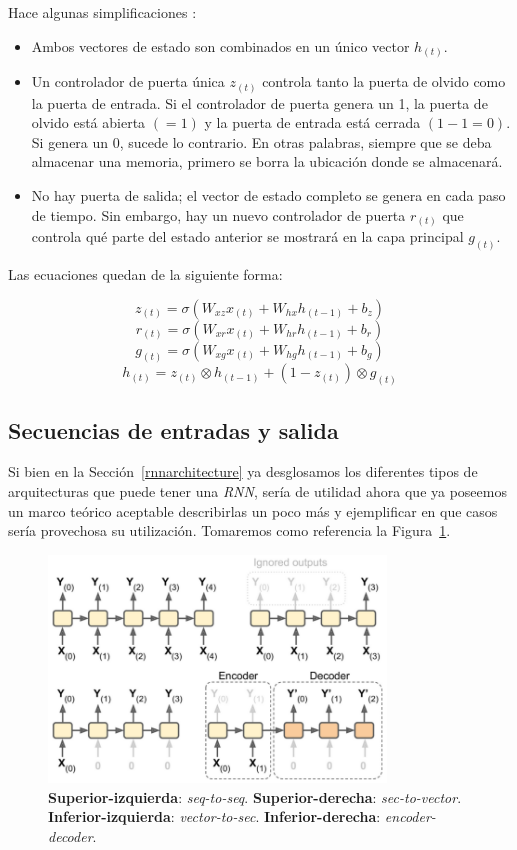 \documentclass[a4paper,12pt]{article}
\begin{document}
Hace algunas simplificaciones \citep{geron}:

\begin{itemize}[noitemsep, topsep=2pt]
	\item Ambos vectores de estado son combinados en un único vector $h_{(t)}$.
	\item Un controlador de puerta única $z_{(t)}$ controla tanto la puerta de olvido como la puerta de entrada. Si el controlador de puerta genera un 1, la puerta de olvido está abierta $(=1)$ y la puerta de entrada está cerrada $(1-1=0)$. Si genera un 0, sucede lo contrario. En otras palabras, siempre que se deba almacenar una memoria, primero se borra la ubicación donde se almacenará.
	\item No hay puerta de salida; el vector de estado completo se genera en cada paso de tiempo. Sin embargo, hay un nuevo controlador de puerta $r_{(t)}$ que controla qué parte del estado anterior se mostrará en la capa principal $g_{(t)}$.
	      
\end{itemize}

Las ecuaciones quedan de la siguiente forma:

$$z_{(t)}=\sigma(W_{xz}x_{(t)} + W_{hx}h_{(t-1)} + b_z)$$
$$r_{(t)}=\sigma(W_{xr}x_{(t)} + W_{hr}h_{(t-1)} + b_r)$$
$$g_{(t)}=\sigma(W_{xg}x_{(t)} + W_{hg}h_{(t-1)} + b_g)$$
$$h_{(t)}=z_{(t)} \otimes h_{(t-1)} + (1-z_{(t)}) \otimes g_{(t)}$$

\subsection{Secuencias de entradas y salida}

Si bien en la Sección~\ref{rnnarchitecture} ya desglosamos los diferentes tipos de arquitecturas que puede tener una \textit{RNN}, sería de utilidad ahora que ya poseemos un marco teórico aceptable describirlas un poco más y ejemplificar en que casos sería provechosa su utilización. Tomaremos como referencia la Figura~\ref{fig:rnnnets}.

\begin{figure}[H]
	\begin{center}				
		\includegraphics[width=0.80\textwidth]{tesis_42.png}
		\caption{\textbf{Superior-izquierda}: \textit{seq-to-seq}. \textbf{Superior-derecha}: \textit{sec-to-vector}. \textbf{Inferior-izquierda}: \textit{vector-to-sec}. \textbf{Inferior-derecha}: \textit{encoder-decoder}. \citep{geron}}
		\label{fig:rnnnets}
	\end{center}
\end{figure}
\end{document}
